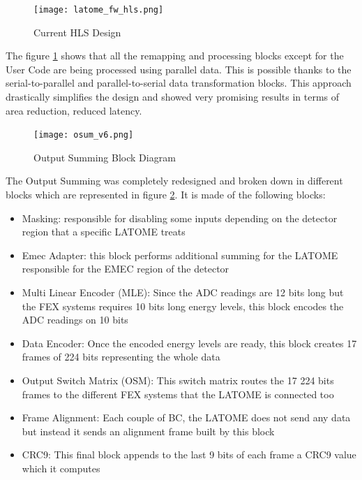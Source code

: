 \begin{figure}
    \centering
    \texttt{[image: latome\_fw\_hls.png]}
    \caption{Current HLS Design}
    \label{fig:current-HLS-design}
\end{figure}

The figure \ref{fig:current-HLS-design} shows that all the remapping and processing blocks except for the User Code are being processed using parallel data. This is possible thanks to the serial-to-parallel and parallel-to-serial data transformation blocks. This approach drastically simplifies the design and showed very promising results in terms of area reduction, reduced latency.

\begin{figure}
    \centering
    \texttt{[image: osum\_v6.png]}
    \caption{Output Summing Block Diagram}
    \label{fig:osum-v6}
\end{figure}

The Output Summing was completely redesigned and broken down in different blocks which are represented in figure \ref{fig:osum-v6}. It is made of the following blocks:
\begin{itemize}
    \item Masking: responsible for disabling some inputs depending on the detector region that a specific LATOME treats
    \item Emec Adapter: this block performs additional summing for the LATOME responsible for the EMEC region of the detector
    \item Multi Linear Encoder (MLE): Since the ADC readings are 12 bits long but the FEX systems requires 10 bits long energy levels, this block encodes the ADC readings on 10 bits
    \item Data Encoder: Once the encoded energy levels are ready, this block creates 17 frames of 224 bits representing the whole data
    \item Output Switch Matrix (OSM): This switch matrix routes the 17 224 bits frames to the different FEX systems that the LATOME is connected too
    \item Frame Alignment: Each couple of BC, the LATOME does not send any data but instead it sends an alignment frame built by this block
    \item CRC9: This final block appends to the last 9 bits of each frame a CRC9 value which it computes
\end{itemize}